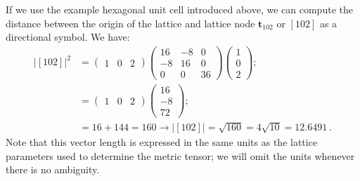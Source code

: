 	If we use the example hexagonal unit cell introduced above, we can compute the distance between the origin of the lattice and lattice node $\mathbf{t}_{102}$ or $[102]$ as a directional symbol.  We have:
	\begin{equation*}
	\begin{split}
		\vert[102]\vert^2 &= \begin{pmatrix}1&0&2\end{pmatrix}\begin{pmatrix}16 & -8& 0 \\ -8 & 16 & 0\\  0 & 0 & 36\end{pmatrix}
		\begin{pmatrix}1\\ 0\\ 2\end{pmatrix};\\
		&= \begin{pmatrix}1&0&2\end{pmatrix}\begin{pmatrix}16\\ -8\\ 72\end{pmatrix};\\
		&= 16+144 = 160 \rightarrow \vert[102]\vert = \sqrt{160}=4\sqrt{10}=12.6491\ .
	\end{split}
	\end{equation*}
	Note that this vector length is expressed in the same units as the lattice parameters used to determine the metric tensor; we will omit the units whenever there is no ambiguity.  
	
	
